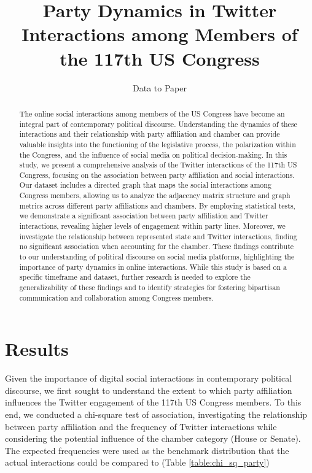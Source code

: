 \documentclass[11pt]{article}
\title{Party Dynamics in Twitter Interactions among Members of the 117th US Congress}
\author{Data to Paper}
\begin{document}
\maketitle
\begin{abstract}
The online social interactions among members of the US Congress have become an integral part of contemporary political discourse. Understanding the dynamics of these interactions and their relationship with party affiliation and chamber can provide valuable insights into the functioning of the legislative process, the polarization within the Congress, and the influence of social media on political decision-making. In this study, we present a comprehensive analysis of the Twitter interactions of the 117th US Congress, focusing on the association between party affiliation and social interactions. Our dataset includes a directed graph that maps the social interactions among Congress members, allowing us to analyze the adjacency matrix structure and graph metrics across different party affiliations and chambers. By employing statistical tests, we demonstrate a significant association between party affiliation and Twitter interactions, revealing higher levels of engagement within party lines. Moreover, we investigate the relationship between represented state and Twitter interactions, finding no significant association when accounting for the chamber. These findings contribute to our understanding of political discourse on social media platforms, highlighting the importance of party dynamics in online interactions. While this study is based on a specific timeframe and dataset, further research is needed to explore the generalizability of these findings and to identify strategies for fostering bipartisan communication and collaboration among Congress members.
\end{abstract}
\section*{Results}

Given the importance of digital social interactions in contemporary political discourse, we first sought to understand the extent to which party affiliation influences the Twitter engagement of the 117th US Congress members. To this end, we conducted a chi-square test of association, investigating the relationship between party affiliation and the frequency of Twitter interactions while considering the potential influence of the chamber category (House or Senate). The expected frequencies were used as the benchmark distribution that the actual interactions could be compared to (Table {}\ref{table:chi_sq_party})
\end{document}
